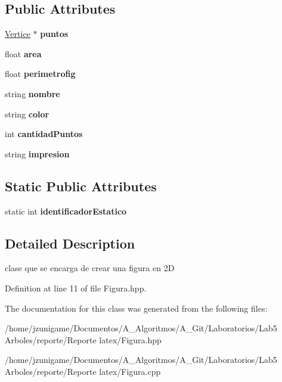 \subsection*{Public Attributes}
\begin{DoxyCompactItemize}
\item 
\mbox{\label{class_figura_ae0b5056c74aade600709487640d5f679}} 
\hyperlink{class_vertice}{Vertice} $\ast$ {\bfseries puntos}
\item 
\mbox{\label{class_figura_ae3d1ec3d0d1e9786bb200112a018bc87}} 
float {\bfseries area}
\item 
\mbox{\label{class_figura_a261190a959c238f674083daaadb6bd79}} 
float {\bfseries perimetrofig}
\item 
\mbox{\label{class_figura_a5be336617ed8a4d4f28115297b38da02}} 
string {\bfseries nombre}
\item 
\mbox{\label{class_figura_a9f519b9504b95440f124a3099070e952}} 
string {\bfseries color}
\item 
\mbox{\label{class_figura_ad45f3e1033b11ecd2205154a7dff6a36}} 
int {\bfseries cantidad\+Puntos}
\item 
\mbox{\label{class_figura_a29836f970de23e98d29116a0179f8618}} 
string {\bfseries impresion}
\end{DoxyCompactItemize}
\subsection*{Static Public Attributes}
\begin{DoxyCompactItemize}
\item 
\mbox{\label{class_figura_a06e9faa5dd891e95a5d4f041e63266b7}} 
static int {\bfseries identificador\+Estatico}
\end{DoxyCompactItemize}


\subsection{Detailed Description}
clase que se encarga de crear una figura en 2D 

Definition at line 11 of file Figura.\+hpp.



The documentation for this class was generated from the following files\+:\begin{DoxyCompactItemize}
\item 
/home/jzunigame/\+Documentos/\+A\+\_\+\+Algoritmos/\+A\+\_\+\+Git/\+Laboratorios/\+Lab5 Arboles/reporte/\+Reporte latex/Figura.\+hpp\item 
/home/jzunigame/\+Documentos/\+A\+\_\+\+Algoritmos/\+A\+\_\+\+Git/\+Laboratorios/\+Lab5 Arboles/reporte/\+Reporte latex/Figura.\+cpp\end{DoxyCompactItemize}
